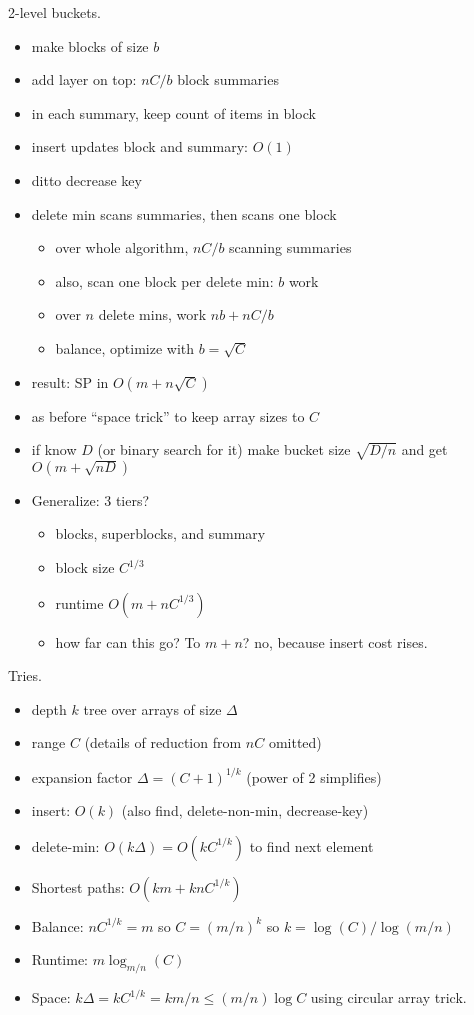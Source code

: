 \documentclass{article}
\begin{document}
2-level buckets.
\begin{itemize}
\item make blocks of size $b$
\item add layer on top: $nC/b$ block summaries
\item in each summary, keep count of items in block
\item insert updates block and summary: $O(1)$
\item ditto decrease key
\item delete min scans summaries, then scans one block
  \begin{itemize}
  \item over whole algorithm, $nC/b$ scanning summaries
  \item also, scan one block per delete min: $b$ work
  \item over $n$ delete mins, work $nb+nC/b$
  \item balance, optimize with $b=\sqrt{C}$
  \end{itemize}
\item result: SP in $O(m+n\sqrt{C})$
\item as before ``space trick'' to keep array sizes to $C$
\item if know $D$ (or binary search for it) make bucket size
  $\sqrt{D/n}$ and get $O(m+\sqrt{nD})$
\item Generalize: 3 tiers?
  \begin{itemize}
  \item blocks, superblocks, and summary
  \item block size $C^{1/3}$
  \item runtime $O(m+nC^{1/3})$
  \item how far can this go?  To $m+n$?  no, because insert cost rises.
  \end{itemize}
\end{itemize}

Tries.
\begin{itemize}
\item depth $k$ tree over arrays of size $\Delta$
\item range $C$ (details of reduction from $nC$ omitted)
\item expansion factor $\Delta=(C+1)^{1/k}$ (power of 2 simplifies)
\item insert: $O(k)$ (also find, delete-non-min, decrease-key)
\item delete-min: $O(k\Delta)=O(kC^{1/k})$ to find next element
\item Shortest paths: $O(km+knC^{1/k})$
\item Balance: $nC^{1/k}=m$ so $C=(m/n)^k$ so $k=\log(C)/\log(m/n)$
\item Runtime: $m\log_{m/n}(C)$
\item Space: $k\Delta=kC^{1/k}=km/n\le (m/n)\log C$ using circular array trick.
\end{itemize}
\end{document}
